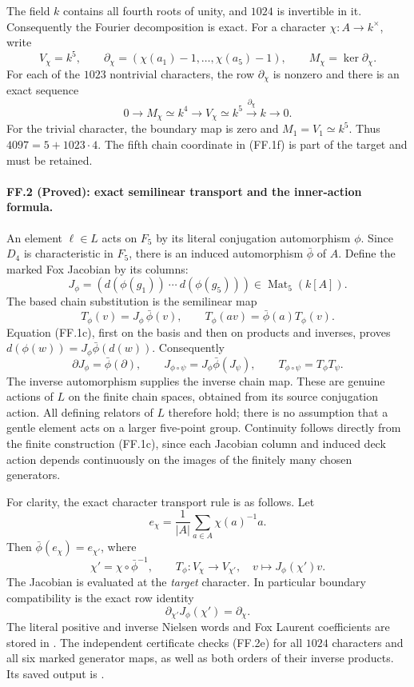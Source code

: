 The field $k$ contains all fourth roots of unity, and $1024$
is invertible in it. Consequently the Fourier decomposition is
exact. For a character $\chi:A\to k^\times$, write
\[
 V_\chi=k^5,\qquad
 \partial_\chi=(\chi(a_1)-1,\ldots,\chi(a_5)-1),\qquad
 M_\chi=\ker\partial_\chi.
 \tag{FF.1e}
\]
For each of the $1023$ nontrivial characters, the row
$\partial_\chi$ is nonzero and there is an exact sequence
\[
 0\longrightarrow M_\chi\simeq k^4
 \longrightarrow V_\chi\simeq k^5
 \stackrel{\partial_\chi}{\longrightarrow}k
 \longrightarrow0.
 \tag{FF.1f}
\]
For the trivial character, the boundary map is zero and
$M_1=V_1\simeq k^5$. Thus
$4097=5+1023\cdot4$. The fifth chain coordinate in
(FF.1f) is part of the target and must be retained.

\paragraph{FF.2 (Proved): exact semilinear transport and the inner-action formula.}
An element $\ell\in L$ acts on $F_5$ by its literal conjugation
automorphism $\phi$. Since $D_4$ is characteristic in $F_5$,
there is an induced automorphism $\bar\phi$ of $A$. Define
the marked Fox Jacobian by its columns:
\[
 J_\phi=(d(\phi(g_1))\ \cdots\ d(\phi(g_5)))
       \in\operatorname{Mat}_5(k[A]).
 \tag{FF.2a}
\]
The based chain substitution is the semilinear map
\[
 T_\phi(v)=J_\phi\,\bar\phi(v),\qquad
 T_\phi(av)=\bar\phi(a)T_\phi(v).
 \tag{FF.2b}
\]
Equation (FF.1c), first on the basis and then on products and
inverses, proves
$d(\phi(w))=J_\phi\bar\phi(d(w))$. Consequently
\[
 \partial J_\phi=\bar\phi(\partial),\qquad
 J_{\phi\circ\psi}=J_\phi\bar\phi(J_\psi),\qquad
 T_{\phi\circ\psi}=T_\phi T_\psi.
 \tag{FF.2c}
\]
The inverse automorphism supplies the inverse chain map.
These are genuine actions of $L$ on the finite chain spaces,
obtained from its source conjugation action. All defining
relators of $L$ therefore hold; there is no assumption that
a gentle element acts on a larger five-point group.
Continuity follows directly from the finite construction
(FF.1c), since each Jacobian column and induced deck action
depends continuously on the images of the finitely many
chosen generators.

For clarity, the exact character transport rule is as follows.
Let
\[
 e_\chi=\frac1{|A|}\sum_{a\in A}\chi(a)^{-1}a.
\]
Then $\bar\phi(e_\chi)=e_{\chi'}$, where
\[
 \boxed{\quad \chi'=\chi\circ\bar\phi^{-1},\qquad
 T_\phi:V_\chi\longrightarrow V_{\chi'},\quad
 v\longmapsto J_\phi(\chi')v.\quad}
 \tag{FF.2d}
\]
The Jacobian is evaluated at the \emph{target} character.
In particular boundary compatibility is the exact row identity
\[
                \partial_{\chi'}J_\phi(\chi')=\partial_\chi.
 \tag{FF.2e}
\]
The literal positive and inverse Nielsen words and Fox Laurent
coefficients are stored in
.
The independent certificate
 checks (FF.2e) for
all $1024$ characters and all six marked generator maps,
as well as both orders of their inverse products. Its saved
output is .

